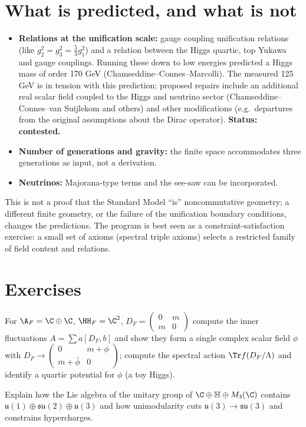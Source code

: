 \section{What is predicted, and what is not}

\begin{itemize}
\item \textbf{Relations at the unification scale:} gauge coupling unification relations (like $g_2^2=g_3^2=\tfrac53g_1^2$) and a relation between the Higgs quartic, top Yukawa and gauge couplings. Running these down to low energies predicted a Higgs mass of order 170 GeV (Chamseddine--Connes--Marcolli). The measured 125 GeV is in tension with this prediction; proposed repairs include an additional real scalar field coupled to the Higgs and neutrino sector (Chamseddine--Connes--van Suijlekom and others) and other modifications (e.g.\ departures from the original assumptions about the Dirac operator). \textbf{Status: contested.}
\item \textbf{Number of generations and gravity:} the finite space accommodates three generations as input, not a derivation.
\item \textbf{Neutrinos:} Majorana-type terms and the see-saw can be incorporated.
\end{itemize}

\begin{whatwrong}
This is not a proof that the Standard Model ``is'' noncommutative geometry; a different finite geometry, or the failure of the unification boundary conditions, changes the predictions. The program is best seen as a constraint-satisfaction exercise: a small set of axioms (spectral triple axioms) selects a restricted family of field content and relations.
\end{whatwrong}

\section*{Exercises}
\begin{exercise}
For $\A_F=\C\oplus\C$, $\HH_F=\C^2$, $D_F=\begin{pmatrix}0&m\\m&0\end{pmatrix}$ compute the inner fluctuations $A=\sum a[D_F,b]$ and show they form a single complex scalar field $\phi$ with $D_F\to\begin{pmatrix}0&m+\phi\\\bar m+\bar\phi&0\end{pmatrix}$; compute the spectral action $\Tr f(D_F/\Lambda)$ and identify a quartic potential for $\phi$ (a toy Higgs).
\end{exercise}
\begin{exercise}
Explain how the Lie algebra of the unitary group of $\C\oplus\mathbb H\oplus M_3(\C)$ contains $\mathfrak u(1)\oplus\mathfrak{su}(2)\oplus\mathfrak u(3)$ and how unimodularity cuts $\mathfrak u(3)\to\mathfrak{su}(3)$ and constrains hypercharges.
\end{exercise}
